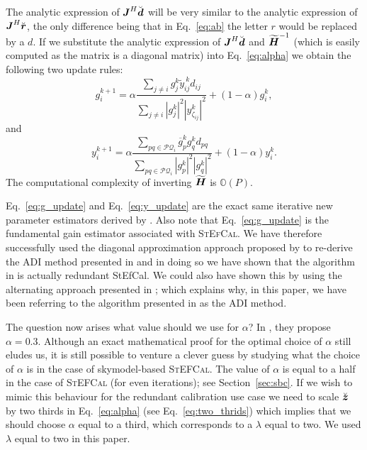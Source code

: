 \documentclass[useAMS,usenatbib]{mn2e}
\newcommand{\bz}{\bmath{z}}
\newcommand{\br}{\bmath{r}}
\newcommand{\bd}{\bmath{d}}
\newcommand{\bJ}{\bmath{J}}
\newcommand{\bH}{\bmath{H}}
\newcommand{\conj}[1]{\overline{#1}}
\begin{document}
The analytic expression of $\bJ^H\breve{\bd}$ will be very similar to the analytic 
expression of $\bJ^H\breve{\br}$, the only difference being that in Eq.~\eqref{eq:ab} the letter $r$ would be replaced by a $d$. If we substitute the analytic expression
of $\bJ^H\breve{\bd}$ and $\widetilde{\bH}^{-1}$ (which is easily computed as the matrix is a diagonal matrix) into Eq.~\eqref{eq:alpha} we obtain the following two update rules:
\begin{equation}
\label{eq:g_update}
g_{i}^{k+1} = \alpha \frac{\sum_{j\neq i} g_j^k \widetilde{y}_{ij}^{~\!\!k} d_{ij}}{\sum_{j\neq i} |g_j^k|^2|y_{\zeta_{ij}}^k|^2} + (1-\alpha) g_i^k, 
\end{equation}
and
\begin{equation}
\label{eq:y_update}
y_{i}^{k+1} = \alpha \frac{\sum_{pq \in \mathcal{PQ}_i} \conj{g}_p^k g_q^k d_{pq}}{\sum_{pq \in \mathcal{PQ}_i}|g_p^k|^2|g_q^k|^2} + (1-\alpha) y_i^k. 
\end{equation}
The computational complexity of inverting $\widetilde{\bH}$ is $\mathbb{O}(P)$.

Eq.~\eqref{eq:g_update} and Eq.~\eqref{eq:y_update} are the exact same iterative new parameter estimators derived by \citet{Marthi2014}. Also note that Eq.~\eqref{eq:g_update} is the fundamental
gain estimator associated with \textsc{StEfCal}. We have therefore successfully used the diagonal approximation approach proposed by \citet{Smirnov2015} to re-derive the ADI method presented in 
\citet{Marthi2014} and in doing so we have shown that the algorithm in \citet{Marthi2014} is actually redundant StEfCal. We could also have shown this by using the alternating approach 
presented in \citet{Salvini2014}; which explains why, in this paper, we have been referring to the algorithm presented in \citet{Marthi2014} as the ADI method.

The question now arises what value should we use for $\alpha$? In \citet{Marthi2014}, they propose 
$\alpha = 0.3$. Although an exact mathematical proof for the optimal choice of $\alpha$ still eludes us, it is still possible to
venture a clever guess by studying what the choice of $\alpha$ is in the case of skymodel-based \textsc{StEFCal}. The value of $\alpha$ is equal to a half 
in the case of \textsc{StEFCal} (for even iterations); see Section~\ref{sec:sbc}. If we wish to mimic this behaviour for the redundant calibration use case we need to scale $\breve{\bz}$ by two thirds in Eq.~\eqref{eq:alpha} (see Eq.~\eqref{eq:two_thrids}) which implies that we should choose $\alpha$ equal to a third, which corresponds to a $\lambda$ equal to two.
We used $\lambda$ equal to two in this paper.
\end{document}
